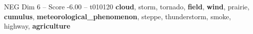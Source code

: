 \begin{textsample}{NEG Dim 6 – Score -6.00 – t010120}  \label{ex:f6_neg_037}
\textbf{cloud}, storm, tornado, \textbf{field}, \textbf{wind}, prairie, \textbf{cumulus}, \textbf{meteorological\_phenomenon}, steppe, thunderstorm, smoke, highway, \textbf{agriculture}

\end{textsample}
